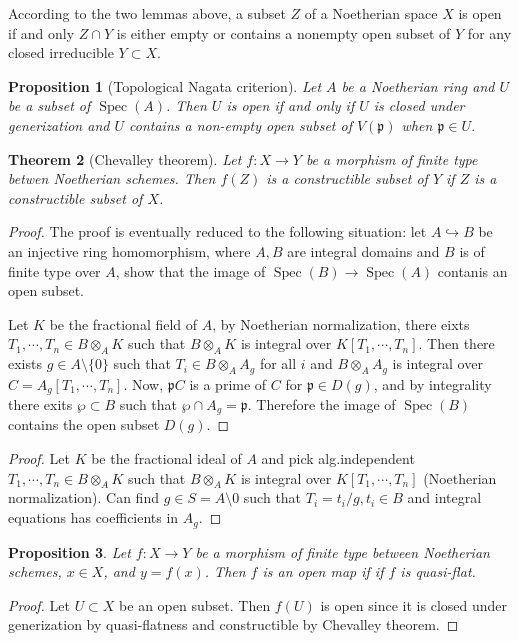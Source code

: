 \documentclass[leqno]{amsart}
\DeclareMathOperator{\Spec}{Spec}
\newcommand{\1}{\mathbf{1}}
\newcommand{\fp}{\mathfrak p}
\newtheorem{thm}{Theorem}[section]
\newtheorem{prop}[thm]{Proposition}
\theoremstyle{definition}
\theoremstyle{remark}
\begin{document}
According to the two lemmas above,
a subset $Z$ of a Noetherian space $X$ is open if and only 
$Z\cap Y$ is either empty or contains a nonempty open subset 
of  $Y$ for any closed irreducible  $Y\subset X$.
\begin{prop}[Topological Nagata criterion]\label{prop:Nagata}
	Let $A$ be a Noetherian ring
	and $U$ be a subset of $\Spec(A)$.
	Then $U$ is open if and only if
	$U$ is closed under generization 
	and $U$ contains a non-empty open subset of 
	$V(\fp)$ when  $\fp\in U$.
\end{prop}


\begin{thm}[Chevalley theorem]
	Let $f\colon X\to Y$ be a morphism of finite type
	betwen Noetherian schemes.
	Then $f(Z)$ is a constructible subset of  $Y$
	if $Z$ is a constructible subset of  $X$.
\end{thm}
\begin{proof}
	The proof is eventually reduced to the following 
	situation:
	let $A\hookrightarrow B$ be an injective ring homomorphism,
	where $A,B$ are integral domains
	and $B$ is of finite type over  $A$,
	show that the image of $\Spec(B)\to \Spec(A)$ 
	contanis an open subset.

	Let $K$ be the fractional field of  $A$,
	by Noetherian normalization,
	there eixts  $T_1,\cdots,T_n\in B\otimes_AK$
	such that $B\otimes_AK$
	is integral over  $K[T_1,\cdots,T_n]$.
	Then there exists $g\in A\setminus\{0\}$ 
	such that $T_i\in B\otimes_AA_g$
	for all  $i$ and  $B\otimes_AA_g$
	is integral over  $C=A_g[T_1,\cdots,T_n]$.
	Now, $\fp C$ is a prime of $C$ for $\fp\in D(g)$,
	and by integrality there exits $\wp\subset B$
	such that $\wp\cap A_g=\fp$.
	Therefore the image of  $\Spec(B)$
	contains the open subset  $D(g)$.
\end{proof}

\begin{proof}
	Let $K$ be the fractional ideal of  $A$
	and pick alg.independent  $T_1,\cdots,T_n\in B\otimes_AK$
	such that $B\otimes_AK$ is integral over
	$K[T_1,\cdots,T_n]$ (Noetherian normalization).
	Can find $g\in S=A\setminus 0$
	such that  $T_i=t_i/g, t_i\in B$
	and integral equations has coefficients in  $A_g$.
\end{proof}

\begin{prop}
	Let $f\colon X\to Y$ be a morphism of finite type
	between Noetherian schemes,
	$x\in X$, and  $y=f(x)$.
	Then $f$ is an open map if 
	if $f$ is quasi-flat.
\end{prop}
\begin{proof}
	Let $U\subset X$ be an open subset.
	Then $f(U)$ is open 
	since it is closed under generization
	by quasi-flatness and 
	constructible by Chevalley theorem.
\end{proof}
\end{document}
